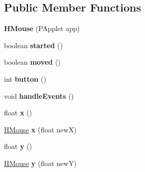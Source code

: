 \subsection*{Public Member Functions}
\begin{DoxyCompactItemize}
\item 
\hypertarget{classhype_1_1event_1_1_h_mouse_a0ac8e5d2ccc6c12a7b1e05a6c42d94d1}{{\bfseries H\-Mouse} (P\-Applet app)}\label{classhype_1_1event_1_1_h_mouse_a0ac8e5d2ccc6c12a7b1e05a6c42d94d1}

\item 
\hypertarget{classhype_1_1event_1_1_h_mouse_ac573179fd6a317b9655c5c85f35ad682}{boolean {\bfseries started} ()}\label{classhype_1_1event_1_1_h_mouse_ac573179fd6a317b9655c5c85f35ad682}

\item 
\hypertarget{classhype_1_1event_1_1_h_mouse_ab7460ed1c2567297329223027e675da2}{boolean {\bfseries moved} ()}\label{classhype_1_1event_1_1_h_mouse_ab7460ed1c2567297329223027e675da2}

\item 
\hypertarget{classhype_1_1event_1_1_h_mouse_a28b9c5b4e422ab3a6cafad3836936f33}{int {\bfseries button} ()}\label{classhype_1_1event_1_1_h_mouse_a28b9c5b4e422ab3a6cafad3836936f33}

\item 
\hypertarget{classhype_1_1event_1_1_h_mouse_abb6b90eddc9ed4c5c572f06cb47cf02d}{void {\bfseries handle\-Events} ()}\label{classhype_1_1event_1_1_h_mouse_abb6b90eddc9ed4c5c572f06cb47cf02d}

\item 
\hypertarget{classhype_1_1event_1_1_h_mouse_a46e064610253ef6c3af70c75617768ed}{float {\bfseries x} ()}\label{classhype_1_1event_1_1_h_mouse_a46e064610253ef6c3af70c75617768ed}

\item 
\hypertarget{classhype_1_1event_1_1_h_mouse_a03b9ab054a4717ce62a88c0f9825b7f3}{\hyperlink{classhype_1_1event_1_1_h_mouse}{H\-Mouse} {\bfseries x} (float new\-X)}\label{classhype_1_1event_1_1_h_mouse_a03b9ab054a4717ce62a88c0f9825b7f3}

\item 
\hypertarget{classhype_1_1event_1_1_h_mouse_ad3d1e1b83ef8b95ae21b6809f0b3c747}{float {\bfseries y} ()}\label{classhype_1_1event_1_1_h_mouse_ad3d1e1b83ef8b95ae21b6809f0b3c747}

\item 
\hypertarget{classhype_1_1event_1_1_h_mouse_a68db2a9622f518baa89ec44341532014}{\hyperlink{classhype_1_1event_1_1_h_mouse}{H\-Mouse} {\bfseries y} (float new\-Y)}\label{classhype_1_1event_1_1_h_mouse_a68db2a9622f518baa89ec44341532014}


\end{DoxyCompactItemize}
